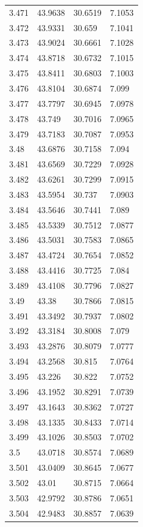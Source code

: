 \begin{tabular}{llll}
3.471 & 43.9638 & 30.6519 & 7.1053 \\
3.472 & 43.9331 & 30.659 & 7.1041 \\
3.473 & 43.9024 & 30.6661 & 7.1028 \\
3.474 & 43.8718 & 30.6732 & 7.1015 \\
3.475 & 43.8411 & 30.6803 & 7.1003 \\
3.476 & 43.8104 & 30.6874 & 7.099 \\
3.477 & 43.7797 & 30.6945 & 7.0978 \\
3.478 & 43.749 & 30.7016 & 7.0965 \\
3.479 & 43.7183 & 30.7087 & 7.0953 \\
3.48 & 43.6876 & 30.7158 & 7.094 \\
3.481 & 43.6569 & 30.7229 & 7.0928 \\
3.482 & 43.6261 & 30.7299 & 7.0915 \\
3.483 & 43.5954 & 30.737 & 7.0903 \\
3.484 & 43.5646 & 30.7441 & 7.089 \\
3.485 & 43.5339 & 30.7512 & 7.0877 \\
3.486 & 43.5031 & 30.7583 & 7.0865 \\
3.487 & 43.4724 & 30.7654 & 7.0852 \\
3.488 & 43.4416 & 30.7725 & 7.084 \\
3.489 & 43.4108 & 30.7796 & 7.0827 \\
3.49 & 43.38 & 30.7866 & 7.0815 \\
3.491 & 43.3492 & 30.7937 & 7.0802 \\
3.492 & 43.3184 & 30.8008 & 7.079 \\
3.493 & 43.2876 & 30.8079 & 7.0777 \\
3.494 & 43.2568 & 30.815 & 7.0764 \\
3.495 & 43.226 & 30.822 & 7.0752 \\
3.496 & 43.1952 & 30.8291 & 7.0739 \\
3.497 & 43.1643 & 30.8362 & 7.0727 \\
3.498 & 43.1335 & 30.8433 & 7.0714 \\
3.499 & 43.1026 & 30.8503 & 7.0702 \\
3.5 & 43.0718 & 30.8574 & 7.0689 \\
3.501 & 43.0409 & 30.8645 & 7.0677 \\
3.502 & 43.01 & 30.8715 & 7.0664 \\
3.503 & 42.9792 & 30.8786 & 7.0651 \\
3.504 & 42.9483 & 30.8857 & 7.0639 \\

\end{tabular}

